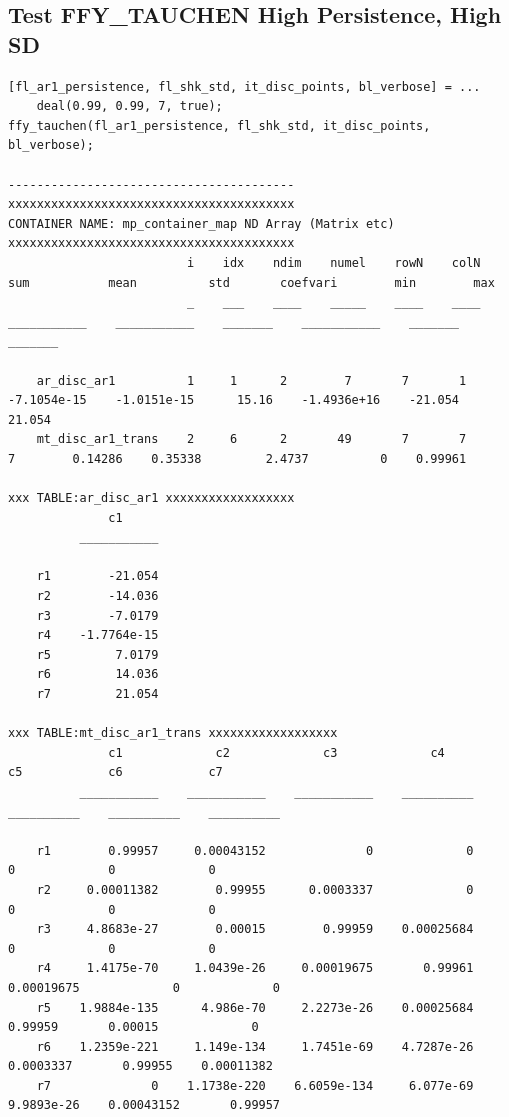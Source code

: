 \documentclass[
]{book}
\begin{document}
\hypertarget{test-ffy_tauchen-high-persistence-high-sd}{%
\subsection{Test FFY\_TAUCHEN High Persistence, High SD}\label{test-ffy_tauchen-high-persistence-high-sd}}

\begin{verbatim}
[fl_ar1_persistence, fl_shk_std, it_disc_points, bl_verbose] = ...
    deal(0.99, 0.99, 7, true);
ffy_tauchen(fl_ar1_persistence, fl_shk_std, it_disc_points, bl_verbose);

----------------------------------------
xxxxxxxxxxxxxxxxxxxxxxxxxxxxxxxxxxxxxxxx
CONTAINER NAME: mp_container_map ND Array (Matrix etc)
xxxxxxxxxxxxxxxxxxxxxxxxxxxxxxxxxxxxxxxx
                         i    idx    ndim    numel    rowN    colN        sum           mean          std       coefvari        min        max  
                         _    ___    ____    _____    ____    ____    ___________    ___________    _______    ___________    _______    _______

    ar_disc_ar1          1     1      2        7       7       1      -7.1054e-15    -1.0151e-15      15.16    -1.4936e+16    -21.054     21.054
    mt_disc_ar1_trans    2     6      2       49       7       7                7        0.14286    0.35338         2.4737          0    0.99961

xxx TABLE:ar_disc_ar1 xxxxxxxxxxxxxxxxxx
              c1     
          ___________

    r1        -21.054
    r2        -14.036
    r3        -7.0179
    r4    -1.7764e-15
    r5         7.0179
    r6         14.036
    r7         21.054

xxx TABLE:mt_disc_ar1_trans xxxxxxxxxxxxxxxxxx
              c1             c2             c3             c4            c5            c6            c7    
          ___________    ___________    ___________    __________    __________    __________    __________

    r1        0.99957     0.00043152              0             0             0             0             0
    r2     0.00011382        0.99955      0.0003337             0             0             0             0
    r3     4.8683e-27        0.00015        0.99959    0.00025684             0             0             0
    r4     1.4175e-70     1.0439e-26     0.00019675       0.99961    0.00019675             0             0
    r5    1.9884e-135      4.986e-70     2.2273e-26    0.00025684       0.99959       0.00015             0
    r6    1.2359e-221     1.149e-134     1.7451e-69    4.7287e-26     0.0003337       0.99955    0.00011382
    r7              0    1.1738e-220    6.6059e-134     6.077e-69    9.9893e-26    0.00043152       0.99957


\end{verbatim}
\end{document}
